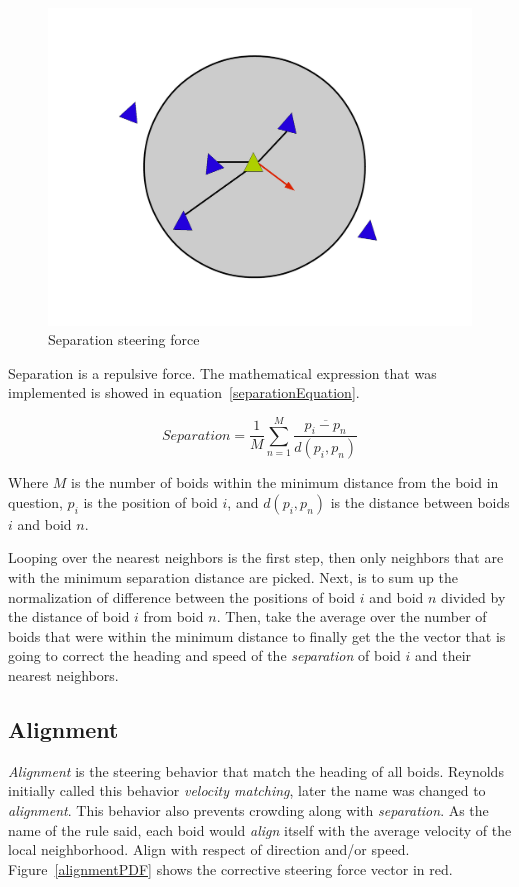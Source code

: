 \begin{figure}[htbp]
\begin{center}
\includegraphics[scale=0.3]{figures/separation.pdf}
\caption{Separation steering force}
\label{separationPDF}
\end{center}
\end{figure}

Separation is a repulsive force. The mathematical expression that was implemented is showed in equation~\ref{separationEquation}.

\begin{equation}
\label{separationEquation}
Separation =\frac{1}{M} \sum_{n=1}^{M} \frac{\overline{p_i - p_n}}{d(p_i,p_n)}
\end{equation}

Where $M$ is the number of boids within the minimum distance from the boid in question, $p_i$ is the position of boid $i$, and $d(p_i,p_n)$ is the distance between boids $i$ and boid $n$.

Looping over the nearest neighbors is the first step, then only neighbors that are with the minimum separation distance are picked. Next, is to sum up the normalization of difference between the positions of boid $i$ and boid $n$ divided by the distance of boid $i$ from boid $n$. Then, take the average over the number of boids that were within the minimum distance to finally get the the vector that is going to correct the heading and speed of the \textit{separation} of boid $i$  and their nearest neighbors. 

\subsection{Alignment}
\textit{Alignment} is the steering behavior that match the heading of all boids. Reynolds initially called this behavior \textit{velocity matching}, later the name was changed to \textit{alignment}. This behavior also prevents crowding along with \textit{separation}. As the name of the rule said, each boid would \textit{align} itself with the average velocity of the local neighborhood. Align with respect of direction and/or speed. Figure~\ref{alignmentPDF}  shows the corrective steering force vector in red.

